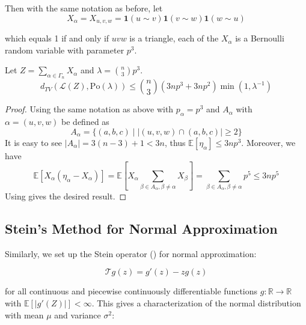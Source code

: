 \documentclass{article}
\begin{document}
Then with the same notation as before, let 
$$
X_{\alpha}=X_{u,v,w} = \mathbf{1}(u\sim v) \mathbf{1}(v\sim w) \mathbf{1}(w\sim u)
$$

which equals 1 if and only if $uvw$ is a triangle, each of the $X_\alpha$ is a Bernoulli random variable with parameter $p^3$. 

\begin{theorem}\label{thm:triangle_poisson_dependent}
    Let $Z = \sum_{\alpha \in \Gamma_n} X_\alpha$ and $\lambda = \binom{n}{3}p^3$.
    \begin{equation*}
        d_{TV}(\mathcal{L}(Z), \text{Po}(\lambda)) \leq \binom{n}{3}(3np^3 + 3np^2) \min (1, \lambda^{-1})
    \end{equation*}
\end{theorem}

\begin{proof}
    Using the same notation as above with $p_\alpha=p^3$ and $A_\alpha$ with $\alpha=(u,v,w)$ be defined as 
    \begin{equation*}
        A_{\alpha} = \{(a,b,c) \mid |(u,v,w)\cap (a,b,c)|\geq 2\}
    \end{equation*}
    It is easy to see $|A_\alpha| = 3(n-3) + 1 < 3n$, thus $\mathbb{E}[\eta_\alpha]\leq 3np^3$. Moreover, we have  
    \begin{equation*}
        \mathbb{E}[X_\alpha(\eta_\alpha - X_\alpha)] = \mathbb{E}[X_\alpha \sum_{\beta \in A_\alpha, \beta \neq \alpha} X_\beta] = \sum_{\beta \in A_\alpha, \beta \neq \alpha} p^5 \leq 3np^5
    \end{equation*}
    Using  gives the desired result.
\end{proof}


\subsection{Stein's Method for Normal Approximation}
Similarly, we set up the Stein operator () for normal approximation:  

\begin{equation}\label{eq:stein_operator_normal}
    \mathcal{T}g(z) = g'(z) - zg(z)
\end{equation}

for all continuous and piecewise continuously differentiable functions $g: \mathbb{R} \to \mathbb{R}$ with $\mathbb{E}[|g'(Z)|]<\infty$. This gives a characterization of the normal distribution with mean $\mu$ and variance $\sigma^2$:  
\end{document}
